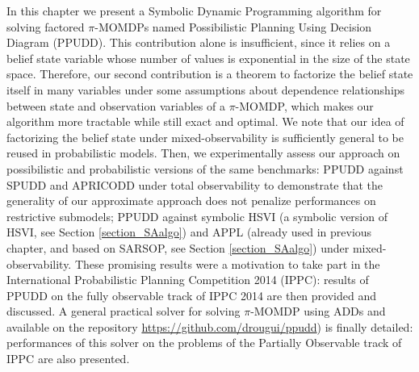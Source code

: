 In this chapter we present a Symbolic Dynamic Programming
algorithm for solving factored $\pi$-MOMDPs named Possibilistic Planning Using
Decision Diagram (PPUDD). 
This contribution alone is insufficient, since it
relies on a belief state variable whose number of values is exponential
in the size of the state space. 
Therefore, our second contribution is a theorem
to factorize the belief state 
itself in many variables under some assumptions
about dependence relationships between state and observation 
variables of a $\pi$-MOMDP, 
which makes our algorithm more tractable while still exact and
optimal. We note that our idea of factorizing the belief state under
mixed-observability is sufficiently general to be reused in probabilistic
models.
Then, we experimentally assess our approach on possibilistic and
probabilistic versions of the same benchmarks: PPUDD against SPUDD
and APRICODD \cite{St-aubin00apricodd:approximate}
under total observability to demonstrate that the generality of our approximate approach does
not penalize performances on restrictive submodels; PPUDD against symbolic
HSVI \cite{Sim:2008:SHS:1620163.1620241}
(a symbolic version of HSVI, see Section \ref{section_SAalgo}) and APPL
\cite{Kurniawati-RSS08,OngShaoHsuWee-IJRR10}
(already used in previous chapter, and based on SARSOP, see Section \ref{section_SAalgo}) 
under mixed-observability. 
These promising results were a motivation to take part
in the International Probabilistic Planning Competition 2014 (IPPC):
results of PPUDD on the fully observable track of IPPC 2014
are then provided and discussed. 
A general practical solver for solving $\pi$-MOMDP using ADDs
and available on the repository \url{https://github.com/drougui/ppudd})
is finally detailed:
performances of this solver 
on the problems of the Partially Observable track of IPPC
are also presented.

